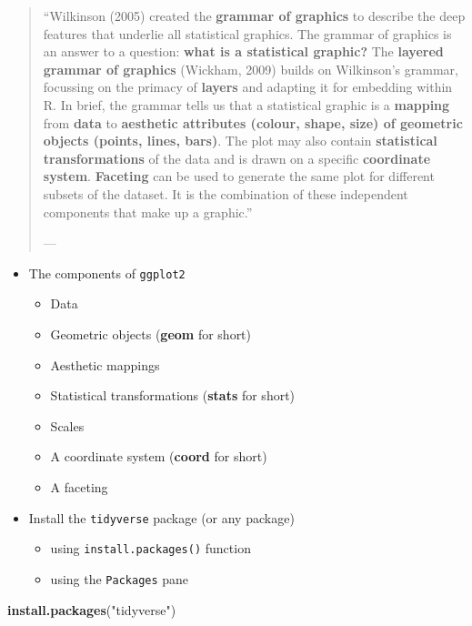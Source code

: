 \documentclass[]{book}
\newenvironment{Shaded}{\begin{snugshade}}{\end{snugshade}}
\newcommand{\KeywordTok}[1]{\textcolor[rgb]{0.13,0.29,0.53}{\textbf{{#1}}}}
\newcommand{\StringTok}[1]{\textcolor[rgb]{0.31,0.60,0.02}{{#1}}}
\newcommand{\NormalTok}[1]{{#1}}
\providecommand{\tightlist}{%
  \setlength{\itemsep}{0pt}\setlength{\parskip}{0pt}}
\begin{document}
\begin{quote}
``Wilkinson (2005) created the \textbf{grammar of graphics} to describe
the deep features that underlie all statistical graphics. The grammar of
graphics is an answer to a question: \textbf{what is a statistical
graphic?} The \textbf{layered grammar of graphics} (Wickham, 2009)
builds on Wilkinson's grammar, focussing on the primacy of
\textbf{layers} and adapting it for embedding within R. In brief, the
grammar tells us that a statistical graphic is a \textbf{mapping} from
\textbf{data} to \textbf{aesthetic attributes (colour, shape, size) of
geometric objects (points, lines, bars)}. The plot may also contain
\textbf{statistical transformations} of the data and is drawn on a
specific \textbf{coordinate system}. \textbf{Faceting} can be used to
generate the same plot for different subsets of the dataset. It is the
combination of these independent components that make up a graphic.''

--- \citet{ggplot2}
\end{quote}

\begin{itemize}
\tightlist
\item
  The components of \texttt{ggplot2}

  \begin{itemize}
  \tightlist
  \item
    Data
  \item
    Geometric objects (\textbf{geom} for short)
  \item
    Aesthetic mappings
  \item
    Statistical transformations (\textbf{stats} for short)
  \item
    Scales
  \item
    A coordinate system (\textbf{coord} for short)
  \item
    A faceting
  \end{itemize}
\item
  Install the \texttt{tidyverse} package (or any package)

  \begin{itemize}
  \tightlist
  \item
    using \texttt{install.packages()} function
  \item
    using the \texttt{Packages} pane
  \end{itemize}
\end{itemize}

\begin{Shaded}
\begin{Highlighting}[]
\KeywordTok{install.packages}\NormalTok{(}\StringTok{"tidyverse"}\NormalTok{)}
\end{Highlighting}
\end{Shaded}
\end{document}
